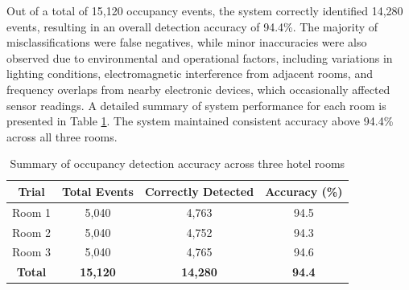 \documentclass[conference]{IEEEtran}
\begin{document}
Out of a total of 15,120 occupancy events, the system correctly identified 14,280 events, resulting in an overall detection accuracy of 94.4\%. The majority of misclassifications were false negatives, while minor inaccuracies were also observed due to environmental and operational factors, including variations in lighting conditions, electromagnetic interference from adjacent rooms, and frequency overlaps from nearby electronic devices, which occasionally affected sensor readings.
A detailed summary of system performance for each room is presented in Table \ref{tab:occupancy_accuracy}. The system maintained consistent accuracy above 94.4\% across all three rooms.




\begin{table}[htbp]
    \centering
    \caption{Summary of occupancy detection accuracy across three hotel rooms}
    \label{tab:occupancy_accuracy}
    \begin{tabular}{|c|c|c|c|}
        \hline
        \textbf{Trial} & \textbf{Total Events} & \textbf{Correctly Detected} & \textbf{Accuracy (\%)} \\
        \hline
        Room 1 & 5,040 & 4,763 & 94.5 \\
        Room 2 & 5,040 & 4,752 & 94.3 \\
        Room 3 & 5,040 & 4,765 & 94.6 \\
        \hline
        \textbf{Total} & \textbf{15,120} & \textbf{14,280} & \textbf{94.4} \\
        \hline
    \end{tabular}
    




    
\end{table}
\end{document}

